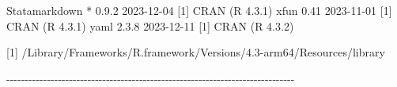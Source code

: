 \documentclass[
  10pt,
  a4paper,
]{book}
\newenvironment{Shaded}{\begin{snugshade}}{\end{snugshade}}
\newcommand{\DecValTok}[1]{\textcolor[rgb]{0.68,0.00,0.00}{#1}}
\newcommand{\FloatTok}[1]{\textcolor[rgb]{0.68,0.00,0.00}{#1}}
\newcommand{\FunctionTok}[1]{\textcolor[rgb]{0.28,0.35,0.67}{#1}}
\newcommand{\NormalTok}[1]{\textcolor[rgb]{0.00,0.46,0.62}{#1}}
\newcommand{\SpecialCharTok}[1]{\textcolor[rgb]{0.37,0.37,0.37}{#1}}
\begin{document}
\begin{Shaded}
\begin{Highlighting}[]
\NormalTok{ Statamarkdown }\SpecialCharTok{*} \DecValTok{0}\NormalTok{.}\FloatTok{9.2}   \DecValTok{2023{-}12{-}04}\NormalTok{ [}\DecValTok{1}\NormalTok{] }\FunctionTok{CRAN}\NormalTok{ (R }\DecValTok{4}\NormalTok{.}\FloatTok{3.1}\NormalTok{)}
\NormalTok{ xfun            }\FloatTok{0.41}    \DecValTok{2023{-}11{-}01}\NormalTok{ [}\DecValTok{1}\NormalTok{] }\FunctionTok{CRAN}\NormalTok{ (R }\DecValTok{4}\NormalTok{.}\FloatTok{3.1}\NormalTok{)}
\NormalTok{ yaml            }\DecValTok{2}\NormalTok{.}\FloatTok{3.8}   \DecValTok{2023{-}12{-}11}\NormalTok{ [}\DecValTok{1}\NormalTok{] }\FunctionTok{CRAN}\NormalTok{ (R }\DecValTok{4}\NormalTok{.}\FloatTok{3.2}\NormalTok{)}

\NormalTok{ [}\DecValTok{1}\NormalTok{] }\SpecialCharTok{/}\NormalTok{Library}\SpecialCharTok{/}\NormalTok{Frameworks}\SpecialCharTok{/}\NormalTok{R.framework}\SpecialCharTok{/}\NormalTok{Versions}\SpecialCharTok{/}\FloatTok{4.3}\SpecialCharTok{{-}}\NormalTok{arm64}\SpecialCharTok{/}\NormalTok{Resources}\SpecialCharTok{/}\NormalTok{library}

\SpecialCharTok{{-}{-}{-}{-}{-}{-}{-}{-}{-}{-}{-}{-}{-}{-}{-}{-}{-}{-}{-}{-}{-}{-}{-}{-}{-}{-}{-}{-}{-}{-}{-}{-}{-}{-}{-}{-}{-}{-}{-}{-}{-}{-}{-}{-}{-}{-}{-}{-}{-}{-}{-}{-}{-}{-}{-}{-}{-}{-}{-}{-}{-}{-}{-}{-}{-}{-}{-}{-}{-}{-}{-}{-}{-}{-}{-}{-}{-}{-}}
\end{Highlighting}
\end{Shaded}


  

\backmatter
\end{document}
